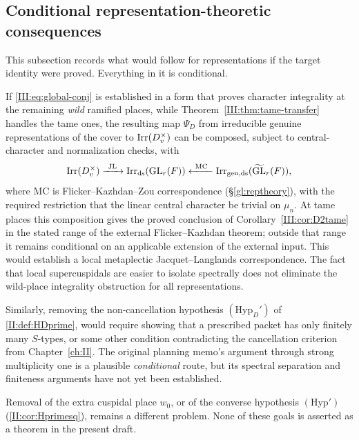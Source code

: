 \subsection{Conditional representation-theoretic consequences}
This subsection records what would follow for representations if the target identity were proved. Everything in it is conditional.

If \eqref{III:eq:global-conj} is established in a form that proves character integrality at the remaining \emph{wild} ramified places, while Theorem~\ref{III:thm:tame-transfer} handles the tame ones, the resulting map $\Psi_D$ from irreducible genuine representations of the cover to $\operatorname{Irr}(D_v^\times)$ can be composed, subject to central-character and normalization checks, with
\[
\operatorname{Irr}(D_v^\times)\xrightarrow{\ \mathrm{JL}\ }
\operatorname{Irr}_{\mathrm{ds}}(\operatorname{GL}_r(F))
\xleftarrow{\ \mathrm{MC}\ }
\operatorname{Irr}_{\mathrm{gen,ds}}(\widetilde{\operatorname{GL}}_r(F)),
\]
where $\mathrm{MC}$ is Flicker--Kazhdan--Zou correspondence (\S\ref{gl:reptheory}), with the required restriction that the linear central character be trivial on $\mu_n$. At tame places this composition gives the proved conclusion of
Corollary~\ref{III:cor:D2tame} in the stated range of the external
Flicker--Kazhdan theorem; outside that range it remains conditional
on an applicable extension of the external input.
This would establish a local metaplectic Jacquet--Langlands correspondence. The fact that local supercuspidals are easier to isolate spectrally does not eliminate the wild-place integrality obstruction for all representations.

Similarly, removing the non-cancellation hypothesis $(\mathrm{Hyp}_D')$ of \cref{II:def:HDprime}, would require showing that a prescribed packet has only finitely many $S$-types, or some other condition contradicting the cancellation criterion from Chapter~\ref{ch:II}. The original planning memo's argument through strong multiplicity one is a plausible \emph{conditional} route, but its spectral separation and finiteness arguments have not yet been established.

Removal of the extra cuspidal place $w_0$, or of the converse hypothesis $(\mathrm{Hyp}')$ (\cref{II:cor:Hprimesq}), remains a different problem. None of these goals is asserted as a theorem in the present draft.
\endgroup
